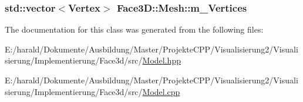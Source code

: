 \subsubsection[{\texorpdfstring{m\+\_\+\+Vertices}{m_Vertices}}]{\setlength{\rightskip}{0pt plus 5cm}std\+::vector$<${\bf Vertex}$>$ Face3\+D\+::\+Mesh\+::m\+\_\+\+Vertices\hspace{0.3cm}{\ttfamily [private]}}\hypertarget{class_face3_d_1_1_mesh_a471af3fd09f58640e4e279d145a7b757}{}\label{class_face3_d_1_1_mesh_a471af3fd09f58640e4e279d145a7b757}


The documentation for this class was generated from the following files\+:\begin{DoxyCompactItemize}
\item 
E\+:/harald/\+Dokumente/\+Ausbildung/\+Master/\+Projekte\+C\+P\+P/\+Visualisierung2/\+Visualisierung/\+Implementierung/\+Face3d/src/\hyperlink{_model_8hpp}{Model.\+hpp}\item 
E\+:/harald/\+Dokumente/\+Ausbildung/\+Master/\+Projekte\+C\+P\+P/\+Visualisierung2/\+Visualisierung/\+Implementierung/\+Face3d/src/\hyperlink{_model_8cpp}{Model.\+cpp}\end{DoxyCompactItemize}
